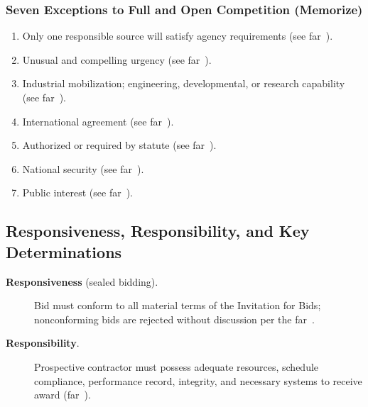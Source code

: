 \documentclass[../main.tex]{subfiles}
\begin{document}
\subsubsection{Seven Exceptions to Full and Open Competition (Memorize)}
\begin{enumerate}
  \item Only one responsible source will satisfy agency requirements (see \ac{far}~\autocite[\S~6.302-1]{FAR}).
  \item Unusual and compelling urgency (see \ac{far}~\autocite[\S~6.302-2]{FAR}).
  \item Industrial mobilization; engineering, developmental, or research capability (see \ac{far}~\autocite[\S~6.302-3]{FAR}).
  \item International agreement (see \ac{far}~\autocite[\S~6.302-4]{FAR}).
  \item Authorized or required by statute (see \ac{far}~\autocite[\S~6.302-5]{FAR}).
  \item National security (see \ac{far}~\autocite[\S~6.302-6]{FAR}).
  \item Public interest (see \ac{far}~\autocite[\S~6.302-7]{FAR}).
\end{enumerate}

\subsection{Responsiveness, Responsibility, and Key Determinations}
\begin{description}
\item[\textbf{Responsiveness} (sealed bidding).] Bid must conform to all material terms of the Invitation for Bids; nonconforming bids are rejected without discussion per the \ac{far}~\autocite{FAR}.
  \item[\textbf{Responsibility}.] Prospective contractor must possess adequate resources, schedule compliance, performance record, integrity, and necessary systems to receive award (\ac{far}~\autocite[\S~9.104]{FAR}).
\end{description}
\end{document}
